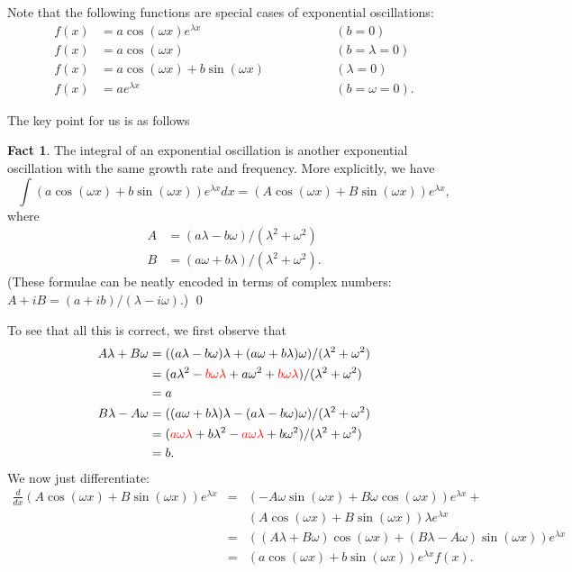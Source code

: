 \documentclass[a4paper]{book}
\newcommand{\RED}[1]{{\color{red}#1}}
\newcommand{\lm}        {\lambda}
\newcommand{\om}        {\omega}
\renewcommand{\:}{\colon}
\theoremstyle{definition}
\newtheorem{fact}[theorem]{Fact}
\begin{document}
Note that the following functions are special cases of exponential
oscillations:
\[ \begin{array}{rlcl}
 f(x) &= a\cos(\om x) e^{\lm x} &\hspace{4em}& (b=0) \\
 f(x) &= a\cos(\om x) && (b=\lm=0) \\
 f(x) &= a\cos(\om x) + b\sin(\om x) && (\lm=0) \\
 f(x) &= a e^{\lm x} && (b=\om=0).
\end{array} \]
 
The key point for us is as follows
\begin{fact}
 The integral of an exponential oscillation is another exponential
 oscillation with the same growth rate and frequency.
 More explicitly, we have
 \[ \int (a\cos(\om x) + b\sin(\om x)) e^{\lm x} dx = 
     (A\cos(\om x) + B\sin(\om x)) e^{\lm x},
 \]
 where 
 \begin{align*}
  A &= (a\lm - b\om)/(\lm^2+\om^2) \\
  B &= (a\om + b\lm)/(\lm^2+\om^2).
 \end{align*}
 (These formulae can be neatly encoded in terms of complex numbers:
 $A+iB=(a+ib)/(\lm-i\om)$.) \qed
\end{fact}

To see that all this is correct, we first observe that 
\begin{align*}
 A\lm + B\om &= ((a\lm-b\om)\lm + (a\om + b\lm)\om)/(\lm^2+\om^2) \\
             &= (a\lm^2 - \RED{b\om\lm} + a\om^2 + \RED{b\om\lm})/
                 (\lm^2 + \om^2) \\
             &= a \\
 B\lm - A\om &= ((a\om + b\lm)\lm - (a\lm - b\om)\om)/(\lm^2+\om^2) \\
             &= (\RED{a\om\lm} + b\lm^2 - \RED{a\om\lm} + b\om^2)/
                 (\lm^2+\om^2) \\
             &= b.
\end{align*}
We now just differentiate:
\begin{eqnarray*}
 \frac{d}{dx} (A\cos(\om x) + B\sin(\om x)) e^{\lm x} 
  &=& (-A\om\sin(\om x) + B\om\cos(\om x)) e^{\lm x} + \\
  &&  (A\cos(\om x) + B\sin(\om x))\lm e^{\lm x} \\
  &=& ((A\lm + B\om)\cos(\om x) + (B\lm - A\om)\sin(\om x))e^{\lm x} \\ 
  &=& (a\cos(\om x) + b\sin(\om x)) e^{\lm x}  f(x).
\end{eqnarray*}
\end{document}

